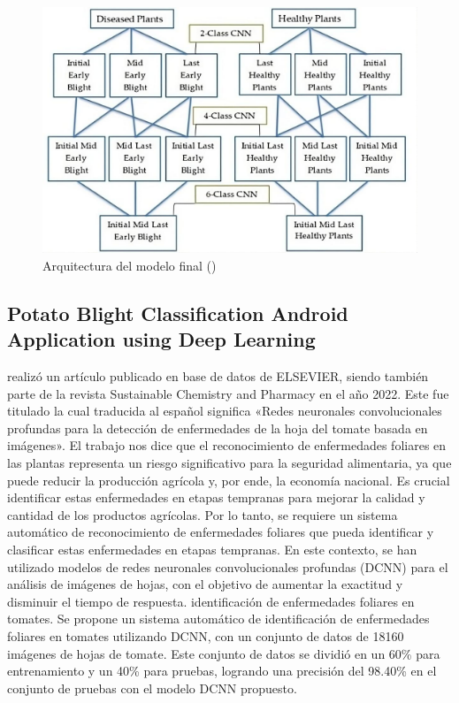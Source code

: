 \begin{figure}[H]
	\begin{center}
		\includegraphics[width=1\textwidth]{2/figures/ant6.2.jpeg}
		\caption{Arquitectura del modelo final (\cite{antecedente6})}
	\end{center}
\end{figure}
\subsection{Potato Blight Classification Android Application using Deep Learning  \citep*{antecedente7}}

\citeauthor{antecedente7} realizó un artículo publicado en base de datos de ELSEVIER, siendo también parte de la revista Sustainable Chemistry and Pharmacy en el año 2022. Este fue titulado  la cual traducida al español significa «Redes neuronales convolucionales profundas para la detección de enfermedades de la hoja del tomate basada en imágenes». El trabajo nos dice que el reconocimiento de enfermedades foliares en las plantas representa un riesgo significativo para la seguridad alimentaria, ya que puede reducir la producción agrícola y, por ende, la economía nacional. Es crucial identificar estas enfermedades en etapas tempranas para mejorar la calidad y cantidad de los productos agrícolas. Por lo tanto, se requiere un sistema automático de reconocimiento de enfermedades foliares que pueda identificar y clasificar estas enfermedades en etapas tempranas. En este contexto, se han utilizado modelos de redes neuronales convolucionales profundas (DCNN) para el análisis de imágenes de hojas, con el objetivo de aumentar la exactitud y disminuir el tiempo de respuesta. identificación de enfermedades foliares en tomates. Se propone un sistema automático de identificación de enfermedades foliares en tomates utilizando DCNN, con un conjunto de datos de 18160 imágenes de hojas de tomate. Este conjunto de datos se dividió en un 60\% para entrenamiento y un 40\% para pruebas, logrando una precisión del 98.40\% en el conjunto de pruebas con el modelo DCNN propuesto.


